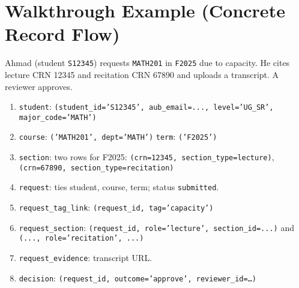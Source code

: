 \documentclass[11pt]{article}
\newcommand{\code}[1]{\texttt{#1}}
\begin{document}
\section*{Walkthrough Example (Concrete Record Flow)}
\small Ahmad (student \code{S12345}) requests \code{MATH201} in \code{F2025} due to capacity. He cites lecture CRN 12345 and recitation CRN 67890 and uploads a transcript. A reviewer approves.

\begin{enumerate}
  \item \code{student}: \code{(student\_id='S12345', aub\_email=..., level='UG\_SR', major\_code='MATH')}
  \item \code{course}: \code{('MATH201', dept='MATH')} \quad \code{term}: \code{('F2025')}
  \item \code{section}: two rows for F2025: \code{(crn=12345, section\_type=lecture)}, \code{(crn=67890, section\_type=recitation)}
  \item \code{request}: ties student, course, term; status \code{submitted}.
  \item \code{request\_tag\_link}: \code{(request\_id, tag='capacity')}
  \item \code{request\_section}: \code{(request\_id, role='lecture', section\_id=...)} and \code{(..., role='recitation', ...)}
  \item \code{request\_evidence}: transcript URL.
  \item \code{decision}: \code{(request\_id, outcome='approve', reviewer\_id=\dots)}
\end{enumerate}
\end{document}
